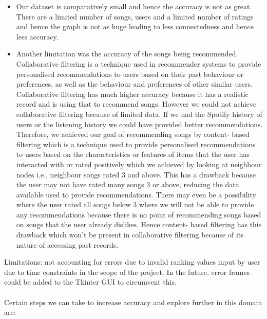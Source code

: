 \documentclass[fontsize=11pt]{article}
\begin{document}
\begin{itemize}
  \item Our dataset is comparatively small and hence the accuracy is not as great. There are a limited number of songs, users and a limited number of ratings and hence the graph is not as huge leading to less connectedness and hence less accuracy. 
  \item Another limitation was the accuracy of the songs being recommended. Collaborative filtering is a technique used in recommender systems to provide personalised recommendations to users based on their past behaviour or preferences, as well as the behaviour and preferences of other similar users. Collaborative filtering has much higher accuracy because it has a realistic record and is using that to recommend songs. However we could not achieve collaborative filtering because of limited data. If we had the Spotify history of users or the listening history we could have provided better recommendations. Therefore, we achieved our goal of recommending songs by content- based filtering which is a technique used to provide personalised recommendations to users based on the characteristics or features of items that the user has interacted with or rated positively which we achieved by looking at neighbour nodes i.e., neighbour songs rated 3 and above. This has a drawback because the user may not have rated many songs 3 or above, reducing the data available used to provide recommendations. There may even be a possibility where the user rated all songs below 3 where we will not be able to provide any recommendations because there is no point of recommending songs based on songs that the user already dislikes. Hence content- based filtering has this drawback which won’t be present in collaborative filtering because of its nature of accessing past records.
\end{itemize}
Limitations: not accounting for errors due to invalid ranking values input by user due to time constraints in the scope of the project. In the future, error frames could be added to the Tkinter GUI to circumvent this. 
\\\\
Certain steps we can take to increase accuracy and explore further in this domain are:
\end{document}

